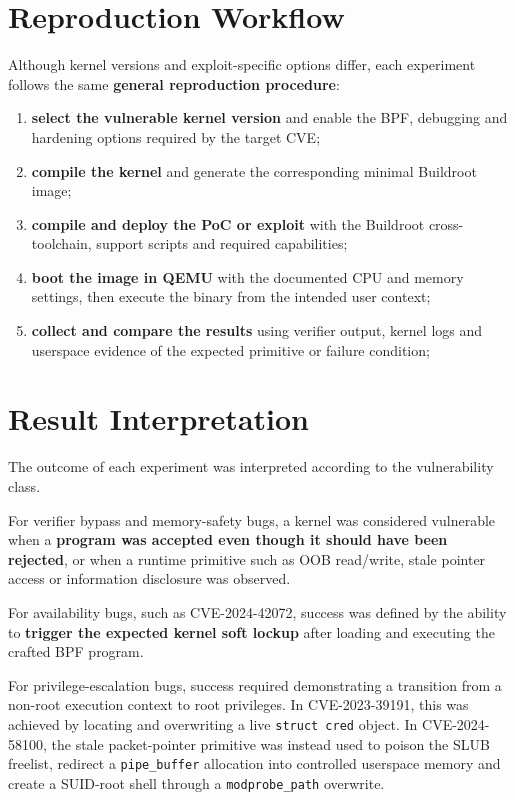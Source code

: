 \documentclass{report}
\begin{document}
    \section{Reproduction Workflow}

    Although kernel versions and exploit-specific options differ, each experiment follows the same \textbf{general reproduction procedure}:

    \begin{enumerate}
        \item \textbf{select the vulnerable kernel version} and enable the BPF, debugging and hardening options required by the target CVE;
        \item \textbf{compile the kernel} and generate the corresponding minimal Buildroot image;
        \item \textbf{compile and deploy the PoC or exploit} with the Buildroot cross-toolchain, support scripts and required capabilities;
        \item \textbf{boot the image in QEMU} with the documented CPU and memory settings, then execute the binary from the intended user context;
        \item \textbf{collect and compare the results} using verifier output, kernel logs and userspace evidence of the expected primitive or failure condition;
    \end{enumerate}

    \section{Result Interpretation}

    The outcome of each experiment was interpreted according to the vulnerability class.

    For verifier bypass and memory-safety bugs, a kernel was considered vulnerable when a \textbf{program was accepted even though it should have been rejected}, or when a runtime primitive such as OOB read/write, stale pointer access or information disclosure was observed.

    For availability bugs, such as CVE-2024-42072, success was defined by the ability to \textbf{trigger the expected kernel soft lockup} after loading and executing the crafted BPF program.

    For privilege-escalation bugs, success required demonstrating a transition from a non-root execution context to root privileges. In CVE-2023-39191, this was achieved by locating and overwriting a live \texttt{struct cred} object. In CVE-2024-58100, the stale packet-pointer primitive was instead used to poison the SLUB freelist, redirect a \texttt{pipe\_buffer} allocation into controlled userspace memory and create a SUID-root shell through a \texttt{modprobe\_path} overwrite.
\end{document}
